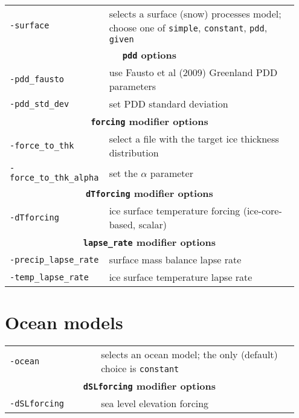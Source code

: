 \documentclass[landscape]{article}
\newcommand{\tabletitle}[1]{\multicolumn{2}{c}{\textbf{#1}}}
\begin{document}
\begin{textblock}{15}
\begin{tabular}{@{}p{0.3\linewidth}p{0.65\linewidth}@{}}
  \texttt{-surface} & selects a surface (snow) processes model; choose one of
  \texttt{simple}, \texttt{constant}, \texttt{pdd}, \texttt{given}\\
  \tabletitle{\texttt{pdd} options} \\
  \texttt{-pdd_fausto} & use Fausto et al (2009) Greenland PDD parameters\\
  \texttt{-pdd_std_dev} & set PDD standard deviation\\
\tabletitle{\texttt{forcing} modifier options}\\
  \texttt{-force_to_thk} & select a file with the target ice thickness
  distribution\\
  \texttt{-force_to_thk_alpha} & set the $\alpha$ parameter\\
\tabletitle{\texttt{dTforcing} modifier options}\\
\texttt{-dTforcing} & ice surface temperature forcing (ice-core-based,
scalar)\\
\tabletitle{\texttt{lapse_rate} modifier options}\\
\texttt{-precip_lapse_rate} & surface mass balance lapse rate\\
\texttt{-temp_lapse_rate} & ice surface temperature lapse rate
\end{tabular}

\section{Ocean models}
\label{sec:ocean-models}

\begin{tabular}{@{}p{0.3\linewidth}p{0.65\linewidth}@{}}
\texttt{-ocean} & selects an ocean model; the only (default) choice is
\texttt{constant} \\
\tabletitle{\texttt{dSLforcing} modifier options} \\
\texttt{-dSLforcing} & sea level elevation forcing\\
\end{tabular}


\end{textblock}
\end{document}
